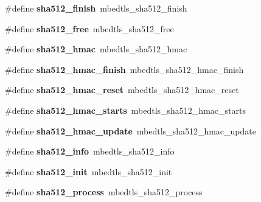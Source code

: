 \begin{DoxyCompactItemize}
\mbox{\label{compat-1_83_8h_a48786ccccff3cd93be02cbce18472cb2}} 
\#define {\bfseries sha512\+\_\+finish}~mbedtls\+\_\+sha512\+\_\+finish
\item 
\mbox{\label{compat-1_83_8h_a9c6d4297dc245db4983fb058d0aa62f5}} 
\#define {\bfseries sha512\+\_\+free}~mbedtls\+\_\+sha512\+\_\+free
\item 
\mbox{\label{compat-1_83_8h_a556cfe1a60cab6a1da90dc918e49dd67}} 
\#define {\bfseries sha512\+\_\+hmac}~mbedtls\+\_\+sha512\+\_\+hmac
\item 
\mbox{\label{compat-1_83_8h_affe83f3e7de3d6d790650f0e801a6b0f}} 
\#define {\bfseries sha512\+\_\+hmac\+\_\+finish}~mbedtls\+\_\+sha512\+\_\+hmac\+\_\+finish
\item 
\mbox{\label{compat-1_83_8h_a66205ab64abcb3b7212cb6a27b54e0a1}} 
\#define {\bfseries sha512\+\_\+hmac\+\_\+reset}~mbedtls\+\_\+sha512\+\_\+hmac\+\_\+reset
\item 
\mbox{\label{compat-1_83_8h_a7252ee5e821bd1c5d0d130aa5a5e292c}} 
\#define {\bfseries sha512\+\_\+hmac\+\_\+starts}~mbedtls\+\_\+sha512\+\_\+hmac\+\_\+starts
\item 
\mbox{\label{compat-1_83_8h_aff0efe175b24e2bccfa000a3ba985381}} 
\#define {\bfseries sha512\+\_\+hmac\+\_\+update}~mbedtls\+\_\+sha512\+\_\+hmac\+\_\+update
\item 
\mbox{\label{compat-1_83_8h_a5f4b8f3b04291d003d34c42d9214697b}} 
\#define {\bfseries sha512\+\_\+info}~mbedtls\+\_\+sha512\+\_\+info
\item 
\mbox{\label{compat-1_83_8h_a3093af54d147b1225538962f06d73cb1}} 
\#define {\bfseries sha512\+\_\+init}~mbedtls\+\_\+sha512\+\_\+init
\item 
\mbox{\label{compat-1_83_8h_af8aaf12069eec40f64403b516a5dffd5}} 
\#define {\bfseries sha512\+\_\+process}~mbedtls\+\_\+sha512\+\_\+process
\item 
\mbox{\label{compat-1_83_8h_a5d86263713a8c1c6ff5f65ce556ea56b}} 

\end{DoxyCompactItemize}
